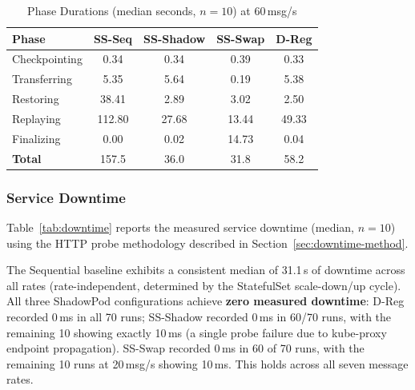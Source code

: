 \documentclass[conference]{IEEEtran}
\begin{document}
\begin{table}[t]
\centering
\caption{Phase Durations (median seconds, $n=10$) at 60\,msg/s}
\label{tab:phases-60}
\begin{tabular}{lcccc}
\toprule
\textbf{Phase} & \textbf{SS-Seq} & \textbf{SS-Shadow} & \textbf{SS-Swap} & \textbf{D-Reg} \\
\midrule
Checkpointing  & 0.34  & 0.34  & 0.39 & 0.33 \\
Transferring   & 5.35  & 5.64  & 0.19 & 5.38 \\
Restoring      & 38.41 & 2.89  & 3.02 & 2.50 \\
Replaying      & 112.80 & 27.68 & 13.44 & 49.33 \\
Finalizing     & 0.00  & 0.02  & 14.73 & 0.04 \\
\midrule
\textbf{Total} & 157.5 & 36.0  & 31.8 & 58.2 \\
\bottomrule
\end{tabular}
\end{table}


\subsubsection{Service Downtime}

Table~\ref{tab:downtime} reports the measured service downtime (median, $n=10$)
using the HTTP probe methodology described in
Section~\ref{sec:downtime-method}.

The Sequential baseline exhibits a consistent median of 31.1\,s of downtime across
all rates (rate-independent, determined by the StatefulSet scale-down/up cycle).
All three ShadowPod configurations achieve \textbf{zero measured downtime}: D-Reg
recorded 0\,ms in all 70 runs; SS-Shadow recorded 0\,ms in 60/70 runs, with the
remaining 10 showing exactly 10\,ms (a single probe failure due to kube-proxy
endpoint propagation). SS-Swap recorded 0\,ms in 60 of 70 runs, with the remaining 10 runs at 20\,msg/s showing 10\,ms. This holds across all seven message rates.
\end{document}
